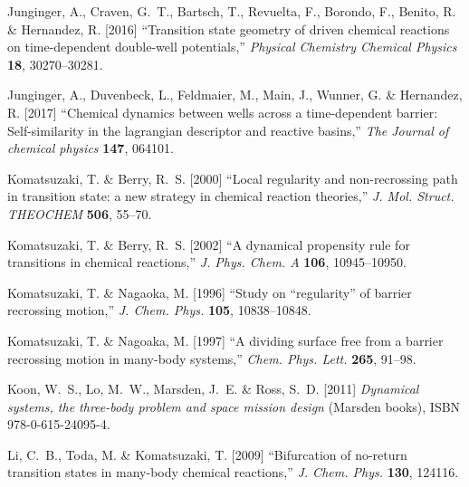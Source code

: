 \documentclass{ws-ijbc}
\begin{document}
\begin{thebibliography}{76}
	Junginger, A., Craven, G.~T., Bartsch, T., Revuelta, F., Borondo, F., Benito,
	R. \& Hernandez, R. [2016] \enquote{Transition state geometry of driven
		chemical reactions on time-dependent double-well potentials,} \emph{Physical
		Chemistry Chemical Physics} \textbf{18},  30270--30281.
	
	Junginger, A., Duvenbeck, L., Feldmaier, M., Main, J., Wunner, G. \& Hernandez,
	R. [2017] \enquote{Chemical dynamics between wells across a time-dependent
		barrier: Self-similarity in the lagrangian descriptor and reactive basins,}
	\emph{The Journal of chemical physics} \textbf{147},  064101.
	
	Komatsuzaki, T. \& Berry, R.~S. [2000] \enquote{{Local regularity and
			non-recrossing path in transition state: a new strategy in chemical reaction
			theories},} \emph{J. Mol. Struct. THEOCHEM} \textbf{506},  55--70.
	
	Komatsuzaki, T. \& Berry, R.~S. [2002] \enquote{{A dynamical propensity rule
			for transitions in chemical reactions},} \emph{J. Phys. Chem. A}
	\textbf{106},  10945--10950.
	
	Komatsuzaki, T. \& Nagaoka, M. [1996] \enquote{{Study on ``regularity'' of
			barrier recrossing motion},} \emph{J. Chem. Phys.} \textbf{105},
	10838--10848.
	
	Komatsuzaki, T. \& Nagoaka, M. [1997] \enquote{{A dividing surface free from a
			barrier recrossing motion in many-body systems},} \emph{Chem. Phys. Lett.}
	\textbf{265},  91--98.
	
	Koon, W.~S., Lo, M.~W., Marsden, J.~E. \& Ross, S.~D. [2011] \emph{{Dynamical
			systems, the three-body problem and space mission design}} (Marsden books),
	ISBN 978-0-615-24095-4.
	
	Li, C.~B., Toda, M. \& Komatsuzaki, T. [2009] \enquote{{Bifurcation of
			no-return transition states in many-body chemical reactions},} \emph{J. Chem.
		Phys.} \textbf{130},  124116.
	

\end{thebibliography}
\end{document}
